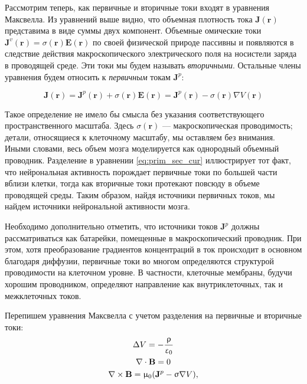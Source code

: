 Рассмотрим теперь, как первичные и вторичные токи входят в уравнения Максвелла.
Из уравнений выше видно, что объемная плотность тока $\mathbf{J}(\mathbf{r})$ представима в виде суммы
двух компонент. Объемные омические токи
$\mathbf{J}^v(\mathbf{r}) = \sigma(\mathbf{r}) \mathbf{E}(\mathbf{r})$ по своей физической природе пассивны
и появляются в следствие действия макроскопического электрического поля на носистели заряда в проводящей среде.
Эти токи мы будем называть \emph{вторичными}.
Остальные члены уравнения будем относить к \emph{первичным} токам $\mathbf{J}^p$:

\begin{equation}
    \mathbf{J}(\mathbf{r}) =
    \mathbf{J}^p(\mathbf{r}) + \sigma(\mathbf{r}) \mathbf{E}(\mathbf{r}) =
    \mathbf{J}^p(\mathbf{r}) - \sigma(\mathbf{r}) \nabla V(\mathbf{r})
    \label{eq:prim_sec_cur}
\end{equation}

Такое определение не имело бы смысла без указания соответствующего пространственного масштаба.
Здесь $\sigma(\mathbf{r})$ --- макроскопическая проводимость; детали, относящиеся к клеточному масштабу,
мы оставляем без внимания. Иными словами, весь объем мозга моделируется как однородный объемный проводник.
Разделение в уравнении \ref{eq:prim_sec_cur} иллюстрирует тот факт, что нейрональная активность порождает
первичные токи по большей части вблизи клетки, тогда как вторичные токи протекают повсюду в объеме проводящей
среды. Таким образом, найдя источники первичных токов, мы найдем источники нейрональной активности мозга.

Необходимо дополнительно отметить, что источники токов $\mathbf{J}^p$ должны рассматриваться как
батарейки, помещенные в макроскопический проводник. При этом, хотя преобразование градиентов концентраций
в ток происходит в основном благодаря диффузии, первичные токи во многом определяются структурой
проводимости на клеточном уровне. В частности, клеточные мембраны, будучи хорошим проводником, определяют
направление как внутриклеточных, так и межклеточных токов.

Перепишем уравнения Максвелла с учетом разделения на первичные и вторичные токи:
\begin{gather}
    \Delta V = -\frac{\uprho}{\upvarepsilon_0} \label{eq:max_quasi_prim_sec1} \\
    \nabla \cdot \mathbf{B} = 0 \label{eq:max_quasi_prim_sec2} \\
    \nabla \times \mathbf{B} = \upmu_0 (\mathbf{J}^p - \upsigma \nabla V) \label{eq:max_quasi_prim_sec3},
\end{gather}

